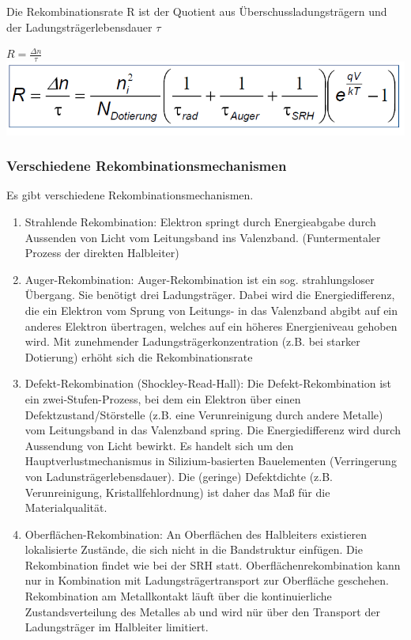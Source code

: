 	Die Rekombinationsrate R ist der Quotient aus Überschussladungsträgern und der Ladungsträgerlebensdauer $\tau$
 
		$R =\frac{\Delta n}{\tau}$
		\newline
		\includegraphics[width=0.4\linewidth]{Kapitel/Kap05/Rekombinationsrate}
		

	
	\subsubsection{Verschiedene Rekombinationsmechanismen}
	Es gibt verschiedene Rekombinationsmechanismen.
	\begin{enumerate}
		\item Strahlende Rekombination:
			\newline
			Elektron springt durch Energieabgabe durch Aussenden von Licht vom Leitungsband ins Valenzband. (Funtermentaler Prozess der direkten Halbleiter)
		\item Auger-Rekombination:
			\newline
			Auger-Rekombination ist ein sog. strahlungsloser Übergang. Sie benötigt drei Ladungsträger. Dabei wird die Energiedifferenz, die ein Elektron vom Sprung von Leitungs- in das Valenzband abgibt auf ein anderes Elektron übertragen, welches auf ein höheres Energieniveau gehoben wird. 
			\newline
			Mit zunehmender Ladungsträgerkonzentration (z.B. bei starker Dotierung) erhöht sich die Rekombinationsrate
		\item Defekt-Rekombination (Shockley-Read-Hall):
			\newline
			Die Defekt-Rekombination ist ein zwei-Stufen-Prozess, bei dem ein Elektron über einen Defektzustand/Störstelle (z.B. eine Verunreinigung durch andere Metalle) vom Leitungsband in das Valenzband spring. Die Energiedifferenz wird durch Aussendung von Licht bewirkt.
			\newline
			Es handelt sich um den Hauptverlustmechanismus in Silizium-basierten Bauelementen (Verringerung von Ladunsträgerlebensdauer). Die (geringe) Defektdichte (z.B. Verunreinigung, Kristallfehlordnung) ist daher das Maß für die Materialqualität.
		\item Oberflächen-Rekombination:
			\newline
			An Oberflächen des Halbleiters existieren lokalisierte Zustände,
			die sich nicht in die Bandstruktur einfügen. Die Rekombination findet wie bei der SRH statt.
			Oberflächenrekombination kann nur in Kombination mit Ladungsträgertransport zur Oberfläche geschehen.
			Rekombination am Metallkontakt läuft über die kontinuierliche
			Zustandsverteilung des Metalles ab und wird nür über den Transport der Ladungsträger im Halbleiter limitiert.
	\end{enumerate}



